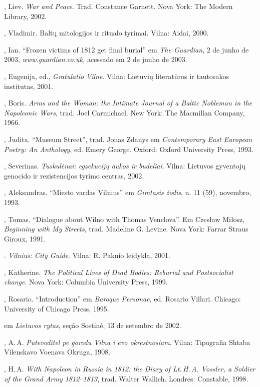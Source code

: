 \begin{bibliohedra}
  , Liev. \textit{War and Peace}. Trad. Constance Garnett. Nova York:
  The Modern Library, 2002.

  , Vladimir. Baltų mitologijos ir ritualo tyrimai. Vilna:
  Aidai, 2000.

  , Ian. ``Frozen victims of 1812 get final burial'' em \textit{The
  Guardian}, 2 de junho de 2003, \textit{www.guardian.co.uk,} acessado em
  2 de junho de 2003.

  , Eugenija, ed., \textit{Gratulatio Vilne}. Vilna: Lietuvių
  literatūros ir tautosakos institutas, 2001.

  , Boris. \textit{Arms and the Woman: the Intimate Journal of a
  Baltic Nobleman in the Napoleonic Wars}, trad. Joel Carmichael. New
  York: The Macmillan Company, 1966.

  , Judita. ``Museum Street'', trad. Jonas Zdanys em
  \textit{Contemporary East European Poetry: An Anthology}, ed. Emery
  George. Oxford: Oxford University Press, 1993.

  , Severinas. \textit{Tuskulėnai: egzekucijų aukos ir budeliai}.
  Vilna: Lietuvos gyventojų genocido ir rezistencijos tyrimo centras,
  2002.


, Aleksandras. ``Miesto vardas Vilnius'' em \textit{Gimtasis
žodis}, n. 11 (59), novembro, 1993.

, Tomas. ``Dialogue about Wilno with Thomas Venclova''. Em
Czesław Miłosz, \textit{Beginning with My Streets}, trad. Madeline G.
Levine. Nova York: Farrar Straus Giroux, 1991.

\titidem. \textit{Vilnius: City Guide}. Vilna: R. Paknio
leidykla, 2001.

, Katherine. \textit{The Political Lives of Dead Bodies: Reburial
and Postsocialist change}. Nova York: Columbia University Press, 1999.

, Rosario. ``Introduction'' em \textit{Baroque Personae}, ed.
Rosario Villari. Chicago: University of Chicago Press, 1995.

 em \textit{Lietuvos rytas}, seção
Sostinė, 13 de setembro de 2002.

, A.\,A. \textit{Putevoditel pe gorodu Vilna i evo okrestnosiam}.
Vilna: Tipografia Shtaba Vilenskavo Voenava Okruga, 1908.

, H.\,A. \textit{With Napoleon in Russia in 1812: the Diary of Lt.\,H.\,A. Vossler, a Soldier of the Grand Army 1812--1813}, trad. Walter
Wallich. Londres: Constable, 1998.


\end{bibliohedra}
